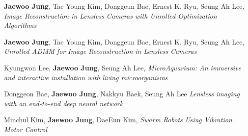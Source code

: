 \documentclass[a4paper,12pt]{memoir} %
\begin{document}
{\textbf{Jaewoo Jung}, Tae Young Kim, Donggeun Bae, Ernest K. Ryu, Seung Ah Lee, \textit{Image Reconstruction in Lensless Cameras with Unrolled Optimization Algorithms}}



{\textbf{Jaewoo Jung}, Tae Young Kim, Donggeun Bae, Ernest K. Ryu, Seung Ah Lee, \textit{Unrolled ADMM for Image Reconstruction in Lensless Cameras}}



{Kyungwon Lee, \textbf{Jaewoo Jung}, Seung Ah Lee, \textit{MicroAquarium: An immersive and interactive installation with living microorganisms}}



{Donggeon Bae, \textbf{Jaewoo Jung}, Nakkyu Baek, Seung Ah Lee \textit{Lensless imaging with an end-to-end deep neural network}}



{Minchul Kim, \textbf{Jaewoo Jung}, DaeEun Kim, \textit{Swarm Robots Using Vibration Motor Control}}


\Sep %

\clearpage %

\userinformation %

\framebreak %


\end{document}
